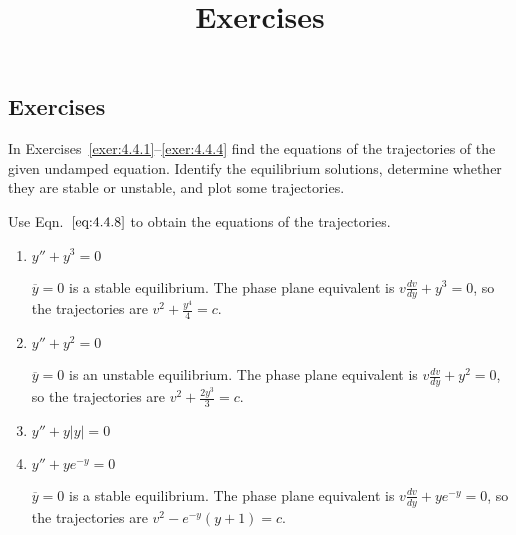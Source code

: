 \documentclass{ximera}
\title{Exercises} \license{CC BY-NC-SA 4.0}
\begin{document}
\begin{abstract}
\end{abstract}
\maketitle

\begin{onlineOnly}
\section*{Exercises}
\end{onlineOnly}

\begin{problem}
In Exercises~\ref{exer:4.4.1}--\ref{exer:4.4.4} find the equations of the
trajectories of the given undamped equation. Identify the equilibrium
solutions, determine whether they are stable or unstable, and
plot some trajectories. 
\begin{hint}
  Use Eqn.~$\eqref{eq:4.4.8}$ to
obtain the equations of the trajectories.  
\end{hint}

\begin{enumerate}
\item\label{exer:4.4.1}   $y''+y^3=0$ 

\begin{solution}
$\overline y=0$ is a stable equilibrium.
The phase plane equivalent is $v\frac{dv}{dy}+y^3=0$, so the
 trajectories are $v^2+\frac{y^4}{4}=c$.
\end{solution}

\item\label{exer:4.4.2}   $y''+y^2=0$

\begin{solution}
$\overline y=0$ is an unstable equilibrium.
The phase plane equivalent is $v\frac{dv}{dy}+y^2=0$, so the
 trajectories are $v^2+\frac{2y^3}{3}=c$.
\end{solution}

\item\label{exer:4.4.3}  
$y''+y|y|=0$ 

\item\label{exer:4.4.4}   $y''+ye^{-y}=0$

\begin{solution}
$\overline y=0$ is a stable equilibrium.
The phase plane equivalent is $v\frac{dv}{dy}+ye^{-y}=0$, so the
 trajectories are $v^2-e^{-y}(y+1)=c$.
\end{solution}
\end{enumerate}
\end{problem}
\end{document}
